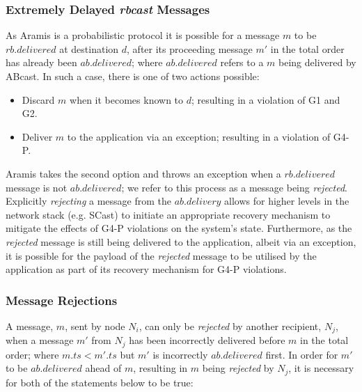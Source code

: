         \subsubsection*{Extremely Delayed \emph{rbcast} Messages}\label{ssec:abcast_rejection}
        As \textsf{Aramis} is a probabilistic protocol it is possible for a message $m$ to be $rb.delivered$ at destination $d$, after its proceeding message $m'$ in the total order has already been $ab.delivered$; where $ab.delivered$ refers to a $m$ being delivered by \textsf{ABcast}. In such a case, there is one of two actions possible:

         \begin{itemize}
            \item    Discard $m$ when it becomes known to $d$; resulting in a violation of G1 and G2.  
            
            \item    Deliver $m$ to the application via an exception; resulting in a violation of G4-P.  
        \end{itemize}                       
        
        \textsf{Aramis} takes the second option and throws an exception when a $rb.delivered$ message is not $ab.delivered$; we refer to this process as a message being \emph{rejected}.  Explicitly \emph{rejecting} a message from the $ab.delivery$ allows for higher levels in the network stack (e.g. \textsf{SCast}) to initiate an appropriate recovery mechanism to mitigate the effects of G4-P violations on the system's state.  Furthermore, as the \emph{rejected} message is still being delivered to the application, albeit via an exception, it is possible for the payload of the \emph{rejected} message to be utilised by the application as part of its recovery mechanism for G4-P violations.    
        
        \subsubsection*{Message Rejections}
        A message, $m$, sent by node $N_i$, can only be \emph{rejected} by another recipient, $N_j$, when a message $m'$ from $N_j$ has been incorrectly delivered before $m$ in the total order; where $m.ts < m'.ts$ but $m'$ is incorrectly $ab.delivered$ first.  In order for $m'$ to be $ab.delivered$ ahead of $m$, resulting in $m$ being \emph{rejected} by $N_j$, it is necessary for both of the statements below to be true:
        
